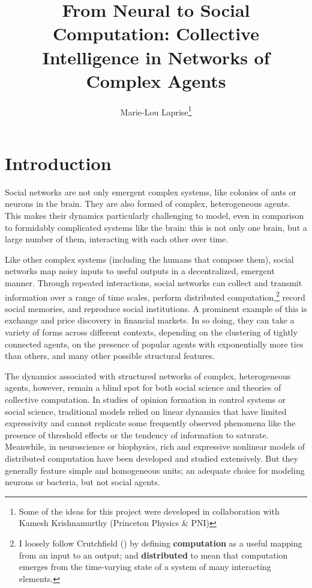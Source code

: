 \documentclass[]{article}
\title{From Neural to Social Computation: Collective Intelligence in Networks of Complex Agents}
\author{Marie-Lou Laprise\footnote{Some of the ideas for this project were developed in collaboration with Kamesh Krishnamurthy (Princeton Physics \& PNI)}}
\begin{document}
	
	\maketitle
\section{Introduction}


Social networks are not only emergent complex systems, like colonies of ants or neurons in the brain. They are also formed of complex, heterogeneous agents. This makes their dynamics particularly challenging to model, even in comparison to formidably complicated systems like the brain: this is not only one brain, but a large number of them, interacting with each other over time. 

Like other complex systems (including the humans that compose them), social networks map noisy inputs to useful outputs in a decentralized, emergent manner.  Through repeated interactions, social networks can collect and transmit information over a range of time scales, perform distributed computation,\footnote{ I loosely follow Crutchfield (\cite{crutchfieldCalculiEmergenceComputation1994}) by defining \textbf{computation} as a useful mapping from an input to an output; and \textbf{distributed} to mean that computation emerges from the time-varying state of a system of many interacting elements.} record social memories, and reproduce social institutions. A prominent example of this is exchange and price discovery in financial markets. In so doing, they can take a variety of forms across different contexts, depending on the clustering of tightly connected agents, on the presence of popular agents with exponentially more ties than others, and many other possible structural features.

The dynamics associated with structured networks of complex, heterogeneous agents, however, remain a blind spot for both social science and theories of collective computation. In studies of opinion formation in control systems or social science, traditional models relied on linear dynamics that have limited expressivity and cannot replicate some frequently observed phenomena like the presence of threshold effects or the tendency of information to saturate. Meanwhile, in neuroscience or biophysics, rich and expressive nonlinear models of distributed computation have been developed and studied extensively. But they generally feature simple and homogeneous units; an adequate choice for modeling neurons or bacteria, but not social agents. 
\end{document}
